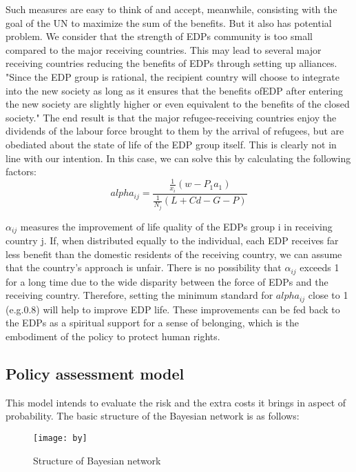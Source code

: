 \documentclass{mcmthesis}
\begin{document}
Such measures are easy to think of and accept, meanwhile, consisting with the goal of the UN to maximize the sum of the benefits. But it also has potential problem. We consider that the strength of EDPs community is too small compared to the major receiving countries. This may lead to several major receiving countries reducing the benefits of EDPs  through setting up alliances.  "Since the EDP group is rational, the recipient country will choose to integrate into the new society as long as it ensures that the benefits ofEDP after entering the new society are slightly higher or even equivalent to the benefits of the closed   society." The end result is that the major refugee-receiving countries enjoy the dividends of the labour force brought to them by the arrival of refugees, but are obediated about the state of life of the EDP group itself. This is clearly not in line with our intention. 
In this case, we can solve this by calculating the following factors:
\begin{equation}
	alpha_{ij}=\dfrac{\frac{1}{x_{i}}(w-P_{1}a_{1})}{\frac{1}{N_{j}}(L+Cd-G-P)}
\end{equation}

$ \alpha_{ij} $ measures the improvement of life quality of the EDPs group i in receiving country j. If, when distributed equally to the individual, each EDP receives far less benefit than the domestic residents of the receiving country, we can assume that the country's approach is unfair. There is no possibility that $ \alpha_{ij} $ exceeds 1 for a long time due to the wide disparity between the force of EDPs and the receiving country.  Therefore, setting the minimum standard for $ alpha_{ij} $ close to 1 (e.g.0.8) will help to improve EDP life. These improvements can be fed back to the EDPs as a spiritual support for a sense of belonging, which is the embodiment of the policy to protect  human rights.  


\subsection{Policy assessment model}
This model intends to evaluate the risk and the extra costs it brings in aspect of probability.
The basic structure of the Bayesian network is as follows:

\begin{figure}[h]%
	\small
	\centering
	\texttt{[image: by]}%
	\caption{Structure of Bayesian network} 
\end{figure}
\end{document}

